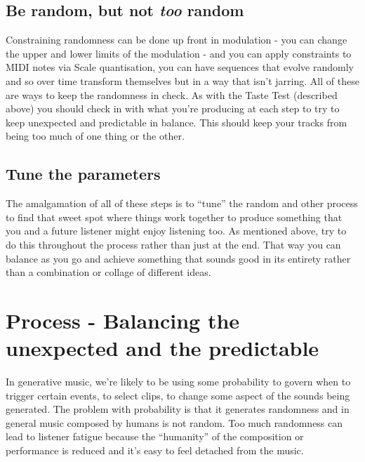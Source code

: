 \documentclass[
  12pt,
  letterpaper,
  oneside,
  open=any]{scrbook}
\begin{document}
\section{\texorpdfstring{Be random, but not \textbf{\emph{too}}
random}{Be random, but not too random}}\label{be-random-but-not-too-random}

Constraining randomness can be done up front in modulation - you can
change the upper and lower limits of the modulation - and you can apply
constraints to MIDI notes via Scale quantisation, you can have sequences
that evolve randomly and so over time transform themselves but in a way
that isn't jarring. All of these are ways to keep the randomness in
check. As with the Taste Test (described above) you should check in with
what you're producing at each step to try to keep unexpected and
predictable in balance. This should keep your tracks from being too much
of one thing or the other.

\section{Tune the parameters}\label{tune-the-parameters}

The amalgamation of all of these steps is to ``tune'' the random and
other process to find that sweet spot where things work together to
produce something that you and a future listener might enjoy listening
too. As mentioned above, try to do this throughout the process rather
than just at the end. That way you can balance as you go and achieve
something that sounds good in its entirety rather than a combination or
collage of different ideas.


\chapter{Process - Balancing the unexpected and the
predictable}\label{009-Process-Balance_unexpected_and_predictable}

In generative music, we're likely to be using some probability to govern
when to trigger certain events, to select clips, to change some aspect
of the sounds being generated. The problem with probability is that it
generates randomness and in general music composed by humans is not
random. Too much randomness can lead to listener fatigue because the
``humanity'' of the composition or performance is reduced and it's easy
to feel detached from the music.
\end{document}
